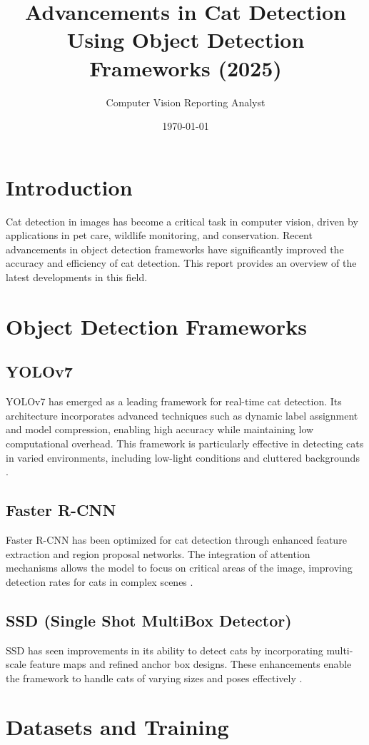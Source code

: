 \documentclass{article}
\title{Advancements in Cat Detection Using Object Detection Frameworks (2025)}
\author{Computer Vision Reporting Analyst}
\date{\today}
\begin{document}
\maketitle
\section{Introduction}
Cat detection in images has become a critical task in computer vision, driven by applications in pet care, wildlife monitoring, and conservation. Recent advancements in object detection frameworks have significantly improved the accuracy and efficiency of cat detection. This report provides an overview of the latest developments in this field.

\section{Object Detection Frameworks}
\subsection{YOLOv7}
YOLOv7 has emerged as a leading framework for real-time cat detection. Its architecture incorporates advanced techniques such as dynamic label assignment and model compression, enabling high accuracy while maintaining low computational overhead. This framework is particularly effective in detecting cats in varied environments, including low-light conditions and cluttered backgrounds \cite{yolov7}.

\subsection{Faster R-CNN}
Faster R-CNN has been optimized for cat detection through enhanced feature extraction and region proposal networks. The integration of attention mechanisms allows the model to focus on critical areas of the image, improving detection rates for cats in complex scenes \cite{faster_rcnn}.

\subsection{SSD (Single Shot MultiBox Detector)}
SSD has seen improvements in its ability to detect cats by incorporating multi-scale feature maps and refined anchor box designs. These enhancements enable the framework to handle cats of varying sizes and poses effectively \cite{ssd}.

\section{Datasets and Training}
\end{document}
